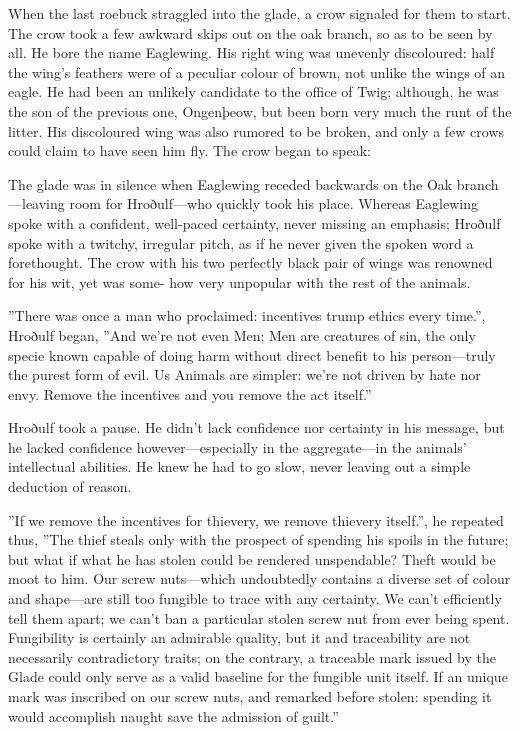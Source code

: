 When the last roebuck straggled into the glade, a crow signaled for them to start. The crow took a few awkward skips out on the oak branch, so as to be seen by all. He bore the name Eaglewing. His right wing was unevenly discoloured: half the wing's feathers were of a peculiar colour of brown, not unlike the wings of an eagle. He had been an unlikely candidate to the office of Twig; although, he was the son of the previous one, Ongenþeow, but been born very much the runt of the litter. His discoloured wing was also rumored to be broken, and only a few crows could claim to have seen him fly. The crow began to speak:



The glade was in silence when Eaglewing receded backwards on the Oak branch---leaving room for Hroðulf---who quickly took his place. Whereas Eaglewing spoke with a confident, well-paced certainty, never missing an emphasis; Hroðulf spoke with a twitchy, irregular pitch, as if he never given the spoken word a forethought. The crow with his two perfectly black pair of wings was renowned for his wit, yet was some-
how very unpopular with the rest of the animals. 

”There was once a man who proclaimed: incentives trump ethics every time.”, Hroðulf began, ”And we're not even Men; Men are creatures of sin, the only specie known capable of doing harm without direct benefit to his person---truly the purest form of evil. Us Animals are simpler: we're not driven by hate nor envy. Remove the incentives and you remove the act itself.”

Hroðulf took a pause. He didn't lack confidence nor certainty in his message, but he lacked confidence however---especially in the aggregate---in the animals' intellectual abilities. He knew he had to go slow, never leaving out a simple deduction of reason.

”If we remove the incentives for thievery, we remove thievery itself.”, he repeated thus, ”The thief steals only with the prospect of spending his spoils in the future; but what if what he has stolen could be rendered unspendable? Theft would be moot to him. Our screw nuts---which undoubtedly contains a diverse set of colour and shape---are still too fungible to trace with any certainty. We can't efficiently tell them apart; we can't ban a particular stolen screw nut from ever being spent. Fungibility is certainly an admirable quality, but it and traceability are not necessarily contradictory traits; on the contrary, a traceable mark issued by the Glade could only serve as a valid baseline for the fungible unit itself. If an unique mark was inscribed on our screw nuts, and remarked before stolen: spending it would accomplish naught save the admission of guilt.”

